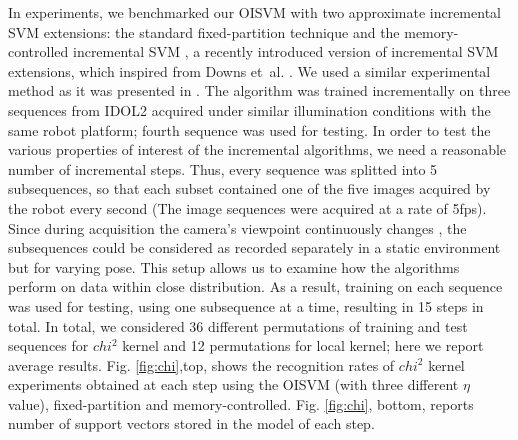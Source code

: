 In experiments, we benchmarked our OISVM with two approximate incremental SVM extensions:
the standard fixed-partition technique \cite{ijcai99} and the memory-controlled incremental
SVM \cite{luo:icra07}, a recently introduced version of incremental SVM
extensions, which inspired from Downs et~al. \cite{DownsGM01}. We used a similar experimental
method as it was presented in \cite{luo:icra07}. The algorithm was trained incrementally on
three sequences from IDOL2 acquired under similar illumination conditions with the same robot
platform; fourth sequence was used for testing. In order to test the various properties of
interest of the incremental algorithms, we need a reasonable number of incremental steps.
Thus, every sequence was splitted into 5 subsequences, so that each subset contained one of the
five images acquired by the robot every second (The image sequences were acquired at a rate of
5fps). Since during acquisition the camera's viewpoint continuously changes \cite{luo:icra07},
the subsequences could be considered as recorded separately in a static environment but for
varying pose. This setup allows us to examine how the algorithms perform on data within close
distribution. As a result, training on each sequence was used for testing, using one subsequence
at a time, resulting in 15 steps in total. In total, we considered 36 different permutations
of training and test sequences for $chi^2$ kernel and 12 permutations for local kernel; here
we report average results. Fig. \ref{fig:chi},top, shows the recognition rates of $chi^2$ kernel experiments
obtained at each step using the OISVM (with three different $\eta$ value), fixed-partition and
memory-controlled. Fig. \ref{fig:chi}, bottom, reports number of support vectors stored in the model of
each step.

